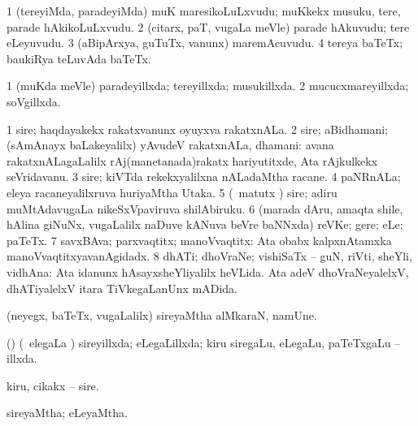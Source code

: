 \bentry
{} 
\gl{\nA}
\expl{}
\bmng
\bnum
\num{1} (tereyiMda, paradeyiMda) muK maresikoLuLxvudu; muKkekx musuku, tere, parade hAkikoLuLxvudu. 
\num{2} (citarx, paT, \mo vugaLa meVle) parade hAkuvudu; tere eLeyuvudu. 
\num{3} (aBipArxya, guTuTx, \mo vanunx) maremAcuvudu. 
\num{4} tereya baTeTx; baukiRya teLuvAda baTeTx. 
\enum
\emng
\eentry

\bentry
{} 
\gl{\gu}
\expl{}
\bmng
\bnum
\num{1} (muKda meVle) paradeyillxda; tereyillxda; musukillxda. 
\num{2} mucucxmareyillxda; soVgillxda. 
\enum
\emng
\eentry

\bentry
{} 
\gl{\nA}
\expl{}
\bmng
\bnum
\num{1} sire; haqdayakekx rakatxvanunx oyuyxva rakatxnALa. 
\num{2} sire; aBidhamani; (sAmAnayx baLakeyalilx) yAvudeV rakatxnALa, dhamani:  avana rakatxnALagaLalilx rAj(manetanada)rakatx hariyutitxde, Ata rAjkulkekx seVridavanu. 
\num{3} sire; kiVTda rekekxyalilxna nALadaMtha racane. 
\num{4} paNRnALa; eleya racaneyalilxruva huriyaMtha Utaka. 
\num{5} (\BUvi\ matutx \gaNi) sire; adiru muMtAdavugaLa nikeSxVpaviruva shilAbiruku. 
\num{6} (marada dAru, amaqta shile, hAlina giNuNx, \mo vugaLalilx naDuve kANuva beVre baNNxda) reVKe; gere; eLe; paTeTx. 
\num{7} savxBAva; parxvaqtitx; manoVvaqtitx:  Ata obabx kalpxnAtamxka manoVvaqtitxyavanAgidadx. 
\num{8} dhATi; dhoVraNe; vishiSaTx -- guN, riVti, sheYli, vidhAna:  Ata idanunx hAsayxsheYliyalilx heVLida.  Ata adeV dhoVraNeyalelxV, dhATiyalelxV itara TiVkegaLanUnx mADida. 
\enum
\emng
\eentry

\bentry
{} 
\gl{\nA}
\expl{}
\bmng
 (neyegx, baTeTx, \mo vugaLalilx) sireyaMtha alMkaraN, namUne. 
\emng
\eentry

\bentry
{} 
\gl{\gu}
\expl{}
\bmng
 (\savi) (\kanmu\ elegaLa \vi) sireyillxda; eLegaLillxda; kiru siregaLu, eLegaLu, paTeTxgaLu -- illxda. 
\emng
\eentry

\bentry
{} 
\gl{\nA}
\expl{}
\bmng
 kiru, cikakx -- sire. 
\emng
\eentry

\bentry
{} 
\gl{\gu}
\expl{}
\bmng
 sireyaMtha; eLeyaMtha. 
\emng
\eentry

\bentry
{} 
\gl{\nA}
\expl{}
\bmng
\emng
\eentry

